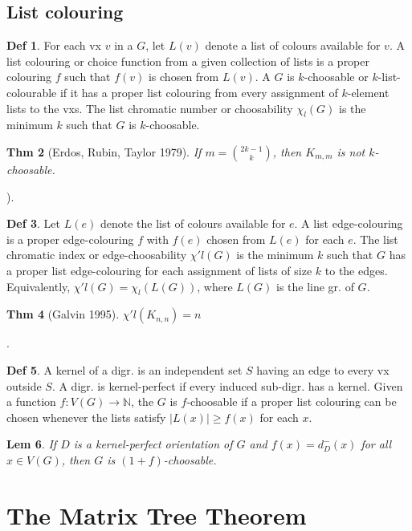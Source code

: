 \documentclass[11pt, fleqn, a4paper, landscape]{article}
\theoremstyle{plain} %
\newtheorem{thm}{Thm}
\newtheorem{lem}[thm]{Lem}
\theoremstyle{remark} %
\theoremstyle{definition} %
\newtheorem{defi}[thm]{Def}
\begin{document}
\begin{multicols}{5}
\subsection{List colouring}

\begin{defi}
For each vx $v$ in a $G$, let $L(v)$ denote a list of colours available for $v$. A list colouring or choice function from a given collection of lists is a proper colouring $f$ such that $f(v)$ is chosen from $L(v)$. A $G$ is $k$-choosable or $k$-list-colourable if it has a proper list colouring from every assignment of $k$-element lists to the vxs. The list chromatic number or choosability $\chi_l(G)$ is the minimum $k$ such that $G$ is $k$-choosable.
\end{defi}

\begin{thm}[Erdos, Rubin, Taylor 1979]
If $m = \binom{2k-1}{k}$, then $K_{m,m}$ is not $k$-choosable.
\end{thm}). 

\begin{defi}
Let $L(e)$ denote the list of colours available for $e$. A list edge-colouring is a proper edge-colouring $f$ with $f(e)$ chosen from $L(e)$ for each $e$. The list chromatic index or edge-choosability $\chi' l(G)$ is the minimum $k$ such that $G$ has a proper list edge-colouring for each assignment of lists of size $k$ to the edges. Equivalently, $\chi'
l(G) = \chi_l(L(G))$, where $L(G)$ is the line gr. of $G$.
\end{defi}
\addtocounter{thm}{1}
\begin{thm}[Galvin 1995]
$\chi' l(K_{n,n}) = n$
\end{thm}.

\begin{defi}
A kernel of a digr. is an independent set $S$ having an edge to every vx
outside $S$. A digr. is kernel-perfect if every induced sub-digr. has a kernel. Given a function $f : V (G) \to \mathbb{N}$, the $G$ is $f$-choosable if a proper list colouring can be chosen whenever the lists
satisfy $|L(x)|\ge f(x)$ for each $x$.
\end{defi}

\begin{lem}
If $D$ is a kernel-perfect orientation of $G$ and $f(x) = d^-_D(x)$ for all $x \in V (G)$, then $G$ is $(1 + f)$-choosable.
\end{lem}

\section{The Matrix Tree Theorem}


\end{multicols}
\end{document}
